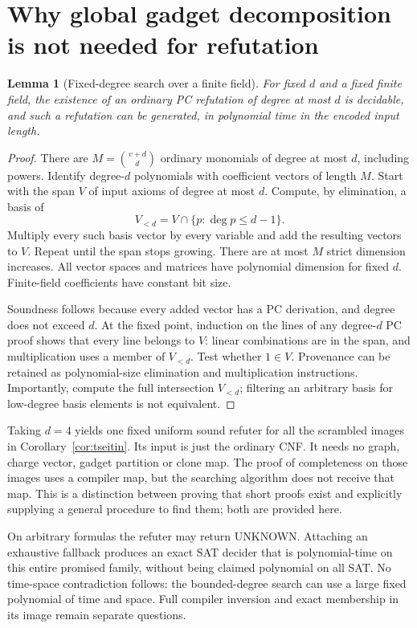 \documentclass[11pt]{article}
\newtheorem{lemma}[theorem]{Lemma}
\begin{document}
\section{Why global gadget decomposition is not needed for refutation}
\begin{lemma}[Fixed-degree search over a finite field]\label{lem:search}
For fixed $d$ and a fixed finite field, the existence of an ordinary PC refutation of degree at most $d$ is decidable, and such a refutation can be generated, in polynomial time in the encoded input length.
\end{lemma}
\begin{proof}
There are $M={v+d\choose d}$ ordinary monomials of degree at most $d$, including powers. Identify degree-$d$ polynomials with coefficient vectors of length $M$. Start with the span $V$ of input axioms of degree at most $d$. Compute, by elimination, a basis of
\[
 V_{<d}=V\cap\{p:\deg p\le d-1\}.
\]
Multiply every such basis vector by every variable and add the resulting vectors to $V$. Repeat until the span stops growing. There are at most $M$ strict dimension increases. All vector spaces and matrices have polynomial dimension for fixed $d$. Finite-field coefficients have constant bit size.

Soundness follows because every added vector has a PC derivation, and degree does not exceed $d$. At the fixed point, induction on the lines of any degree-$d$ PC proof shows that every line belongs to $V$: linear combinations are in the span, and multiplication uses a member of $V_{<d}$. Test whether $1\in V$. Provenance can be retained as polynomial-size elimination and multiplication instructions. Importantly, compute the full intersection $V_{<d}$; filtering an arbitrary basis for low-degree basis elements is not equivalent.
\end{proof}

Taking $d=4$ yields one fixed uniform sound refuter for all the scrambled images in Corollary~\ref{cor:tseitin}. Its input is just the ordinary CNF. It needs no graph, charge vector, gadget partition or clone map. The proof of completeness on those images uses a compiler map, but the searching algorithm does not receive that map. This is a distinction between proving that short proofs exist and explicitly supplying a general procedure to find them; both are provided here.

On arbitrary formulas the refuter may return UNKNOWN. Attaching an exhaustive fallback produces an exact SAT decider that is polynomial-time on this entire promised family, without being claimed polynomial on all SAT. No time-space contradiction follows: the bounded-degree search can use a large fixed polynomial of time and space. Full compiler inversion and exact membership in its image remain separate questions.
\end{document}
